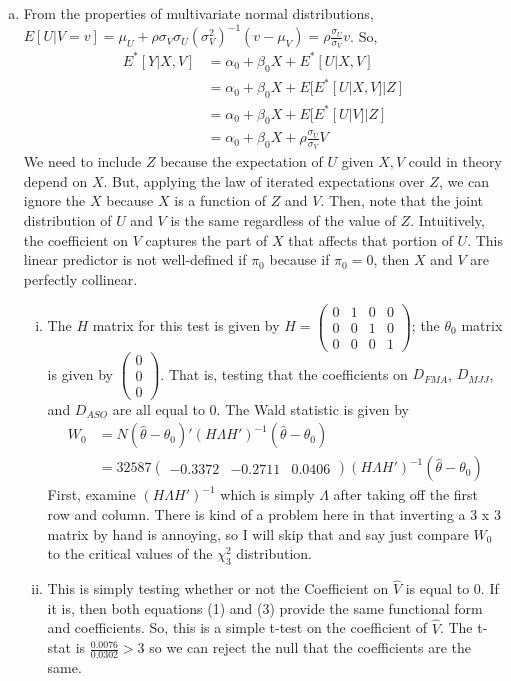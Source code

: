 \documentclass{article}[12pt]
\begin{document}
\begin{enumerate}[(a)]
	\item From the properties of multivariate normal distributions, $E[U | V = v] = \mu_U + \rho \sigma_V \sigma_U (\sigma_V^2)^{-1} (v - \mu_V) = \rho \frac{\sigma_U}{\sigma_V} v$. So,
	\begin{align*}
		E^*[Y| X,V] &= \alpha_0 + \beta_0 X + E^*[U | X,V] \\
		&= \alpha_0 + \beta_0 X + E[E^*[U | X,V]|Z] \\
		&= \alpha_0 + \beta_0 X + E[E^*[U | V]|Z] \\
		&= \alpha_0 + \beta_0 X + \rho \frac{\sigma_U}{\sigma_V}V
	\end{align*}
	We need to include $Z$ because the expectation of $U$ given $X, V$ could in theory depend on $X$. But, applying the law of iterated expectations over $Z$, we can ignore the $X$ because $X$ is a function of $Z$ and $V$. Then, note that the joint distribution of $U$ and $V$ is the same regardless of the value of $Z$. Intuitively, the coefficient on $V$ captures the part of $X$ that affects that portion of $U$. This linear predictor is not well-defined if $\pi_0$ because if $\pi_0 = 0$, then $X$ and $V$ are perfectly collinear.

	\begin{enumerate}[(i)]
		\item The $H$ matrix for this test is given by $H = \begin{pmatrix} 0 & 1 & 0 & 0 \\ 0 & 0 & 1 & 0 \\ 0 & 0 & 0 & 1 \end{pmatrix} $; the $\theta_0$ matrix is given by $\begin{pmatrix} 0 \\ 0 \\0 \end{pmatrix}$. That is, testing that the coefficients on $D_{FMA}$, $D_{MJJ}$, and $D_{ASO}$ are all equal to 0. The Wald statistic is given by
		\begin{align*}
			W_0 &= N (\hat{\theta} - \theta_0)' (H \Lambda H')^{-1} (\hat{\theta} - \theta_0) \\
			&= 32587 \begin{pmatrix} -0.3372 & -0.2711 & 0.0406 \end{pmatrix} (H \Lambda H')^{-1} (\hat{\theta} - \theta_0)
		\end{align*}
		First, examine $(H \Lambda H')^{-1}$ which is simply $\Lambda$ after taking off the first row and column. There is kind of a problem here in that inverting a 3 x 3 matrix by hand is annoying, so I will skip that and say just compare $W_0$ to the critical values of the $\chi^2_3$ distribution.
		\item This is simply testing whether or not the Coefficient on $\hat{V}$ is equal to 0. If it is, then both equations (1) and (3) provide the same functional form and coefficients. So, this is a simple t-test on the coefficient of $\hat{V}$. The t-stat is $\frac{0.0076}{0.0302} > 3$ so we can reject the null that the coefficients are the same.
	\end{enumerate}	
	
\end{enumerate}
\end{document}
